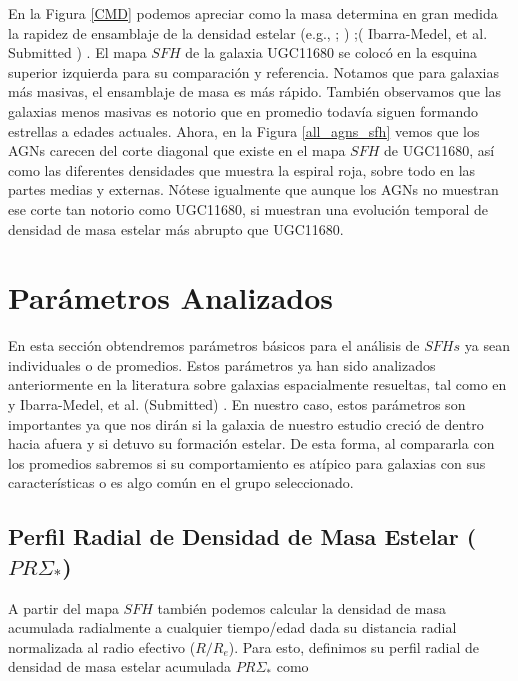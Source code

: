 \noindent En la Figura \ref{CMD} podemos apreciar  como la masa determina en gran medida la rapidez de ensamblaje de la densidad estelar (e.g., \citep{perez2013}; \citep{perezg2008}) ;({\color{red} Ibarra-Medel, et al. Submitted }) . El mapa  $SFH$ de la galaxia UGC11680 se colocó en la esquina superior izquierda para su comparación y referencia. Notamos que para galaxias  más masivas, el ensamblaje de masa  es más rápido. También observamos que las galaxias menos masivas  es notorio que en promedio todavía siguen formando estrellas a edades actuales. Ahora, en la Figura \ref{all_agns_sfh} vemos que los AGNs carecen del corte diagonal que existe en el mapa $SFH$ de UGC11680, así como las diferentes densidades que muestra la espiral roja, sobre todo en las partes medias y externas. Nótese igualmente que aunque los AGNs no muestran ese corte tan notorio como UGC11680, si muestran una evolución temporal de densidad de masa estelar más abrupto que UGC11680.



\section{Parámetros Analizados}

En esta sección obtendremos parámetros básicos para el análisis de $SFHs$ ya sean individuales o de promedios.
Estos parámetros ya han sido analizados anteriormente en la literatura sobre galaxias
espacialmente resueltas, tal como en \citet{cid2013_1} \cite{perez2013} y \citet{gonzalezdelgado2016} {\color{red} Ibarra-Medel, et al. (Submitted) }. En nuestro caso, estos parámetros son importantes ya que nos dirán si la galaxia de nuestro estudio creció de dentro hacia afuera y si detuvo su formación estelar. De esta forma, al compararla con los promedios sabremos si su comportamiento es atípico para galaxias con sus características o es algo común en el grupo seleccionado.


\subsection{Perfil Radial de Densidad de Masa Estelar ($PR \Sigma_{*}$) }

A partir del mapa $SFH$ también podemos calcular la densidad de masa acumulada radialmente a cualquier tiempo/edad dada su distancia radial normalizada al radio efectivo ($R/R_e$). Para esto, definimos su perfil radial de densidad de masa estelar acumulada $PR \Sigma_{*}$ como

